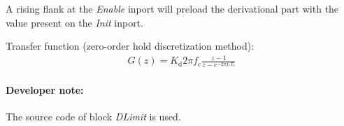%
%
%
%
%
%
%
%
A rising flank at the \textit{Enable} inport will preload the derivational part with the value present on the \textit{Init} inport.
\newline

Transfer function (zero-order hold discretization method):
\begin{eqnarray*}
	G(z) = K_{\mathrm{d}}2 \pi f_{\mathrm{c}}\frac{z-1}{z-e^{-2 \pi f_{\mathrm{c}} T_{\mathrm{s}}}}
\end{eqnarray*}

\paragraph{Developer note:} The source code of block \textit{DLimit} is used.
